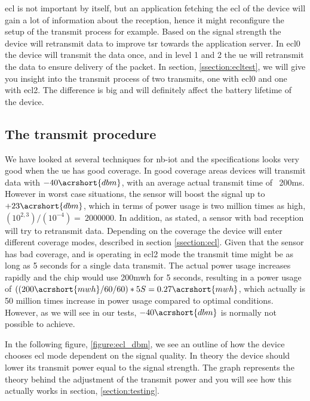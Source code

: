 \documentclass[USenglish]{ifimaster}  %
\begin{document}
\acrshort{ecl} is not important by itself, but an application fetching the \acrshort{ecl} of the device will gain a lot of information about the reception, hence it might reconfigure the setup of the transmit process for example. Based on the signal strength the device will retransmit data to improve \acrfull{tsr} towards the application server. In \acrshort{ecl}0 the device will transmit the data once, and in level 1 and 2 the \acrshort{ue} will retransmit the data to ensure delivery of the packet. In section, \vref{ssection:ecltest}, we will give you insight into the transmit process of two transmits, one with \acrshort{ecl}0 and one with \acrshort{ecl}2. The difference is big and will definitely affect the battery lifetime of the device.

\subsection{The transmit procedure} \label{ssection:transmitprocedure}
We have looked at several techniques for \acrshort{nb-iot} and the specifications looks very good when the \acrshort{ue} has good coverage. In good coverage areas devices will transmit data with ${-40 \acrshort{dbm}}$, with an average actual transmit time of ~200ms. However in worst case situations, the sensor will boost the signal up to ${+23 \acrshort{dbm}}$, which in terms of power usage is two million times as high, ${(10^{2,3}) / (10^{-4}) = ~2 000 000}$. In addition, as stated, a sensor with bad reception will try to retransmit data. Depending on the coverage the device will enter different coverage modes, described in section \vref{ssection:ecl}. Given that the sensor has bad coverage, and is operating in \acrshort{ecl}2 mode the transmit time might be as long as 5 seconds for a single data transmit. The actual power usage increases rapidly and the chip would use 200\acrshort{mwh} for 5 seconds, resulting in a power usage of ${((200 \acrshort{mwh} / 60 / 60) * 5S = 0.27 \acrshort{mwh}}$, which actually is 50 million times increase in power usage compared to optimal conditions. However, as we will see in our tests, ${-40 \acrshort{dbm}}$ is normally not possible to achieve.

In the following figure, \vref{figure:ecl_dbm}, we see an outline of how the device chooses \acrshort{ecl} mode dependent on the signal quality. In theory the device should lower its transmit power equal to the signal strength. The graph represents the theory behind the adjustment of the transmit power and you will see how this actually works in section, \vref{section:testing}.
\end{document}
